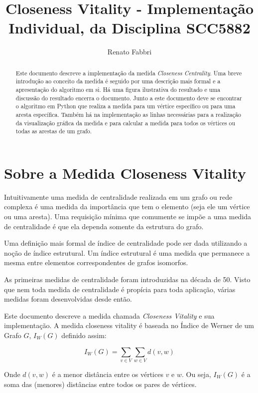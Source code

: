 \documentclass{article}
\begin{document}
\title{Closeness Vitality - Implementação Individual, da Disciplina SCC5882}
\author{Renato Fabbri}

\maketitle

\begin{abstract}
Este documento descreve a implementação da medida \emph{Closeness Centrality}. Uma breve introdução ao conceito da medida é seguido por uma descrição mais formal e a apresentação do algoritmo em si. Há uma figura ilustrativa do resultado e uma discussão do resultado encerra o documento. Junto a este documento deve se encontrar o algoritmo em Python que realiza a medida para um vértice específico ou para uma aresta específica. Também há na implementação as linhas necessárias para a realização da visualização gráfica da medida e para calcular a medida para todos os vértices ou todas as arestas de um grafo.
\end{abstract}

\section{Sobre a Medida Closeness Vitality}
Intuitivamente uma medida de centralidade realizada em um grafo ou rede complexa é uma medida da importância que tem o elemento (seja ele um vértice ou uma aresta). Uma requisição mínima que comumente se impõe a uma medida de centralidade é que ela dependa somente da estrutura do grafo.

Uma definição mais formal de índice de centralidade pode ser dada utilizando a noção de índice estrutural. Um índice estrutural é uma medida que permanece a mesma entre elementos correspondentes de grafos isomorfos.

As primeiras medidas de centralidade foram introduzidas na década de 50. Visto que nem toda medida de centralidade é propícia para toda aplicação, várias medidas foram desenvolvidas desde então.

Este documento descreve a medida chamada \emph{Closeness Vitality} e sua implementação. A medida closeness vitality é baseada no Índice de Werner de um Grafo $G$, $I_W(G)$ definido assim:

\begin{equation}
    I_W(G) = \sum_{v \in V}\sum_{w \in V}d(v,w)
\end{equation}

Onde $d(v,w)$ é a menor distância entre os vértices $v$ e $w$. Ou seja, $I_W(G)$ é a soma das (menores) distâncias entre todos os pares de vértices.
\end{document}
